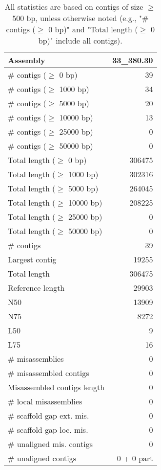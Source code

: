 \documentclass[12pt,a4paper]{article}
\begin{document}
\begin{table}[ht]
\begin{center}
\caption{All statistics are based on contigs of size $\geq$ 500 bp, unless otherwise noted (e.g., "\# contigs ($\geq$ 0 bp)" and "Total length ($\geq$ 0 bp)" include all contigs).}
\begin{tabular}{|l*{1}{|r}|}
\hline
Assembly & 33\_380.30 \\ \hline
\# contigs ($\geq$ 0 bp) & 39 \\ \hline
\# contigs ($\geq$ 1000 bp) & 34 \\ \hline
\# contigs ($\geq$ 5000 bp) & 20 \\ \hline
\# contigs ($\geq$ 10000 bp) & 13 \\ \hline
\# contigs ($\geq$ 25000 bp) & 0 \\ \hline
\# contigs ($\geq$ 50000 bp) & 0 \\ \hline
Total length ($\geq$ 0 bp) & 306475 \\ \hline
Total length ($\geq$ 1000 bp) & 302316 \\ \hline
Total length ($\geq$ 5000 bp) & 264045 \\ \hline
Total length ($\geq$ 10000 bp) & 208225 \\ \hline
Total length ($\geq$ 25000 bp) & 0 \\ \hline
Total length ($\geq$ 50000 bp) & 0 \\ \hline
\# contigs & 39 \\ \hline
Largest contig & 19255 \\ \hline
Total length & 306475 \\ \hline
Reference length & 29903 \\ \hline
N50 & 13909 \\ \hline
N75 & 8272 \\ \hline
L50 & 9 \\ \hline
L75 & 16 \\ \hline
\# misassemblies & 0 \\ \hline
\# misassembled contigs & 0 \\ \hline
Misassembled contigs length & 0 \\ \hline
\# local misassemblies & 0 \\ \hline
\# scaffold gap ext. mis. & 0 \\ \hline
\# scaffold gap loc. mis. & 0 \\ \hline
\# unaligned mis. contigs & 0 \\ \hline
\# unaligned contigs & 0 + 0 part \\ \hline

\end{tabular}
\end{center}
\end{table}
\end{document}
